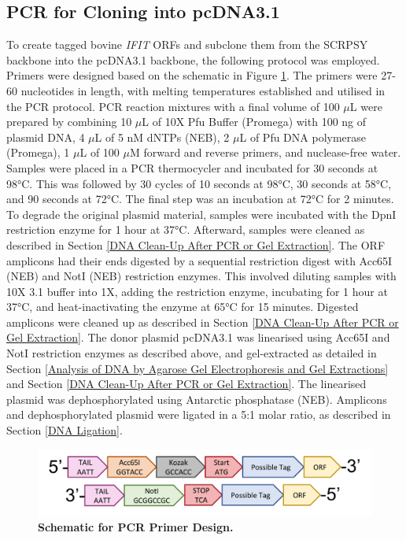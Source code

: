 \subsection{PCR for Cloning into pcDNA3.1} \label{subsec:PCR for Cloning into pcDNA3.1}
To create tagged bovine \textit{IFIT} ORFs and subclone them from the SCRPSY backbone into the pcDNA3.1 backbone, the following protocol was employed. Primers were designed based on the schematic in Figure \ref{fig:Schematic for PCR Primer Design}. The primers were 27-60 nucleotides in length, with melting temperatures established and utilised in the PCR protocol. PCR reaction mixtures with a final volume of 100 \(\mu\)L were prepared by combining 10 \(\mu\)L of 10X Pfu Buffer (Promega) with 100 ng of plasmid DNA, 4 \(\mu\)L of 5 nM dNTPs (NEB), 2 \(\mu\)L of Pfu DNA polymerase (Promega), 1 \(\mu\)L of 100 \(\mu\)M forward and reverse primers, and nuclease-free water. Samples were placed in a PCR thermocycler and incubated for 30 seconds at 98°C. This was followed by 30 cycles of 10 seconds at 98°C, 30 seconds at 58°C, and 90 seconds at 72°C. The final step was an incubation at 72°C for 2 minutes. To degrade the original plasmid material, samples were incubated with the DpnI restriction enzyme for 1 hour at 37°C. Afterward, samples were cleaned as described in Section \ref{DNA Clean-Up After PCR or Gel Extraction}. The ORF amplicons had their ends digested by a sequential restriction digest with Acc65I (NEB) and NotI (NEB) restriction enzymes. This involved diluting samples with 10X 3.1 buffer into 1X, adding the restriction enzyme, incubating for 1 hour at 37°C, and heat-inactivating the enzyme at 65°C for 15 minutes. Digested amplicons were cleaned up as described in Section \ref{DNA Clean-Up After PCR or Gel Extraction}. The donor plasmid pcDNA3.1 was linearised using Acc65I and NotI restriction enzymes as described above, and gel-extracted as detailed in Section \ref{Analysis of DNA by Agarose Gel Electrophoresis and Gel Extractions} and Section \ref{DNA Clean-Up After PCR or Gel Extraction}. The linearised plasmid was dephosphorylated using Antarctic phosphatase (NEB). Amplicons and dephosphorylated plasmid were ligated in a 5:1 molar ratio, as described in Section \ref{DNA Ligation}.

\begin{figure}
    \centering
    \includegraphics[width=1\linewidth]{05. Methods//Figs/03. cloning scheme.pdf}
    \caption[Schematic for PCR Primer Design.]{\textbf{Schematic for PCR Primer Design.}}
    \label{fig:Schematic for PCR Primer Design}
\end{figure}

